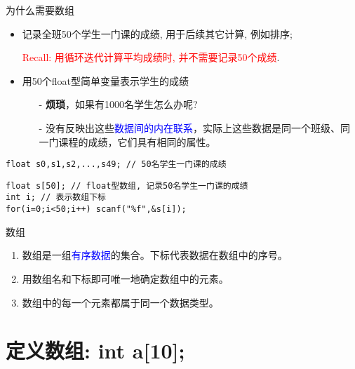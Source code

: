 
\begin{frame}{为什么需要数组}
\vspace{-0.2cm}
\begin{itemize}
	\item 记录全班50个学生一门课的成绩, 用于后续其它计算, 例如排序;
	
		\textcolor{red}{Recall: 用循环迭代计算平均成绩时, 并不需要记录50个成绩}. 
	\item 用50个float型简单变量表示学生的成绩
	\begin{itemize}
		\item[-] \textbf{烦琐}，如果有1000名学生怎么办呢?
		\item[-] 没有反映出这些\textcolor{blue}{数据间的内在联系}，实际上这些数据是同一个班级、同一门课程的成绩，它们具有相同的属性。
	\end{itemize}
\end{itemize}
\begin{lstlisting}
float s0,s1,s2,...,s49; // 50名学生一门课的成绩
\end{lstlisting}
\pause
\begin{lstlisting}
float s[50]; // float型数组, 记录50名学生一门课的成绩
int i; // 表示数组下标
for(i=0;i<50;i++) scanf("%f",&s[i]);
\end{lstlisting}
\vspace{-0.2cm}
\begin{block}{数组}
	\begin{enumerate}
		\item 数组是一组\textcolor{blue}{有序数据}的集合。下标代表数据在数组中的序号。
		\item 用数组名和下标即可唯一地确定数组中的元素。
		\item 数组中的每一个元素都属于同一个数据类型。
	\end{enumerate}
\end{block}
\end{frame}

\section{定义数组: int a[10];}

